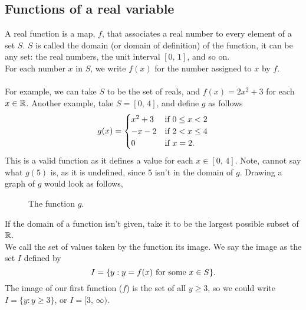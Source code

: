 \documentclass[10pt, a4paper]{article}
\begin{document}
\subsection{Functions of a real variable}
A real function is a map, $f$, that associates a real number to every element of a set $S$. $S$ is called the domain (or domain of definition) of the function, it can be any set: the real numbers, the unit interval $[0,\,1]$, and so on. \\
For each number $x$ in $S$, we write $f(x)$ for the number assigned to $x$ by $f$. \\
\\
For example, we can take $S$ to be the set of reals, and $f(x) = 2x ^ 2 + 3$ for each $x \in \mathbb{R}$. Another example, take $S = [0,\,4]$, and define $g$ as follows
\[
g(x) =
\begin{cases}
    x ^ 2 + 3 &\textnormal{if } 0 \leq x < 2 \\
    -x - 2 &\textnormal{if } 2 < x \leq 4 \\
    0 &\textnormal{if } x = 2.
\end{cases}
\]
This is a valid function as it defines a value for each $x \in [0,\,4]$. Note, cannot say what $g(5)$ is, as it is undefined, since $5$ isn't in the domain of $g$.  Drawing a graph of $g$ would look as follows,
\begin{figure}[ht]
    \centering
    \caption{The function $g$.}
    \label{fig:func1}
\end{figure}
If the domain of a function isn't given, take it to be the largest possible subset of $\mathbb{R}$. \\
We call the set of values taken by the function its image. We say the image as the set $I$ defined by
\[
I = \{y : y = f(x) \textnormal{ for some } x \in S\}.
\]
The image of our first function ($f$) is the set of all $y \geq 3$, so we could write $I = \{y : y \geq 3\}$, or $I = [3,\,\infty)$. \\
\end{document}
